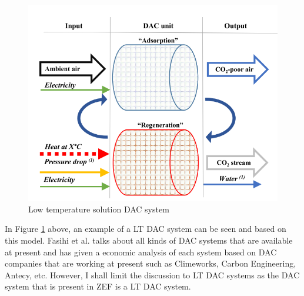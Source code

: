 \begin{figure}[H]
    \centering
    \includegraphics[scale = 0.6]{images/LT_DAC.png}
    \caption{Low temperature solution DAC system}
    \label{fig:LTDAC}
\end{figure}

\noindent
In Figure \ref{fig:LTDAC} above, an example of a LT DAC system can be seen and based on this model. Fasihi et al. talks about all kinds of DAC systems that are available at present and has given a economic analysis of each system based on DAC companies that are working at present such as Climeworks, Carbon Engineering, Antecy, etc. However, I shall limit the discussion to LT DAC systems as the DAC system that is present in ZEF is a LT DAC system. 


